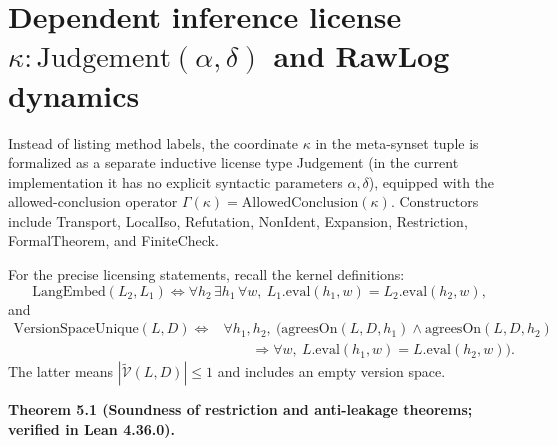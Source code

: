 \documentclass[11pt,a4paper]{article}
\begin{document}
\section{Dependent inference license \(\kappa:\mathrm{Judgement}(\alpha,\delta)\) and RawLog dynamics}

Instead of listing method labels, the coordinate \(\kappa\) in the meta-synset tuple is formalized as a separate inductive license type Judgement (in the current implementation it has no explicit syntactic parameters \(\alpha,\delta\)), equipped with the allowed-conclusion operator \(\Gamma(\kappa)=\mathrm{AllowedConclusion}(\kappa)\). Constructors include Transport, LocalIso, Refutation, NonIdent, Expansion, Restriction, FormalTheorem, and FiniteCheck.

For the precise licensing statements, recall the kernel definitions:
\[
\mathrm{LangEmbed}(L_2,L_1)\Longleftrightarrow
\forall h_2\,\exists h_1\,\forall w,\ L_1.\mathrm{eval}(h_1,w)=L_2.\mathrm{eval}(h_2,w),
\]
and
\[
\begin{aligned}
\mathrm{VersionSpaceUnique}(L,D) \Longleftrightarrow {}&
 \forall h_1,h_2,\ \bigl(\mathrm{agreesOn}(L,D,h_1)\land
 \mathrm{agreesOn}(L,D,h_2)\\
&\qquad \Rightarrow \forall w,\ L.\mathrm{eval}(h_1,w)=L.\mathrm{eval}(h_2,w)\bigr).
\end{aligned}
\]
The latter means \(|\widetilde{\mathcal V}(L,D)|\le1\) and includes an empty version space.

\textbf{Theorem 5.1 (Soundness of restriction and anti-leakage theorems; verified in Lean 4.36.0).}
\end{document}
